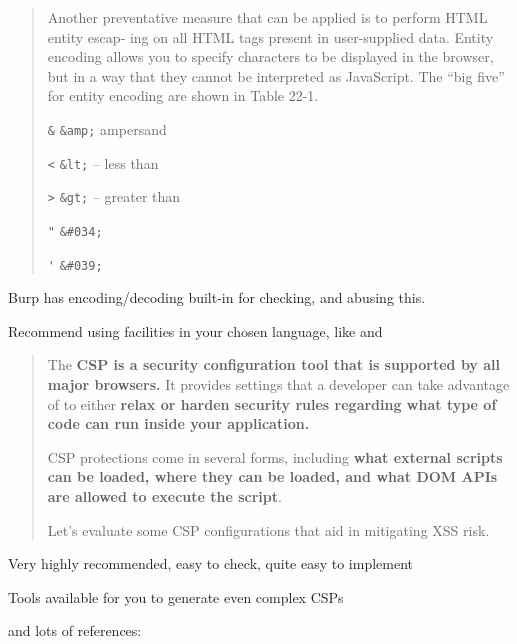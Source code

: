 \documentclass[Screen16to9,17pt]{foils}
\begin{document}


\begin{quote}
Another preventative measure that can be applied is to perform HTML entity escap‐
ing on all HTML tags present in user-supplied data. Entity encoding allows you to
specify characters to be displayed in the browser, but in a way that they cannot be
interpreted as JavaScript.
The “big five” for entity encoding are shown in Table 22-1.

\begin{list2}
\item \verb+&+ \verb+&amp;+ ampersand
\item \verb+<+ \verb+&lt;+ -- less than
\item \verb+>+ \verb+&gt;+ -- greater than
\item \verb+"+ \verb+&#034;+
\item \verb+'+ \verb+&#039;+
\end{list2}
\end{quote}

Burp has encoding/decoding built-in for checking, and abusing this.

Recommend using facilities in your chosen language, like
 and




\begin{quote}
The {\bf CSP is a security configuration tool that is supported by all major browsers.} It provides settings that a developer can take advantage of to either {\bf relax or harden security rules regarding what type of code can run inside your application.}

CSP protections come in several forms, including {\bf what external scripts can be loaded, where they can be loaded, and what DOM APIs are allowed to execute the script}.

Let’s evaluate some CSP configurations that aid in mitigating XSS risk.
\end{quote}

\begin{list2}
\item Very highly recommended, easy to check, quite easy to implement
\item Tools available for you to generate even complex CSPs
\item and lots of references:\\
\\
\end{list2}
\end{document}
